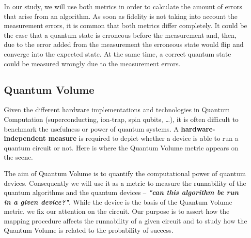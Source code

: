 In our study, we will use both metrics in order to calculate the amount of errors that arise from an algorithm.
As soon as fidelity is not taking into account the measurement errors, it is common that both metrics differ completely.
It could be the case that a quantum state is erroneous before the measurement and, then, due to the error added from the measurement the erroneous state would flip and converge into the expected state.
At the same time, a correct quantum state could be measured wrongly due to the measurement errors.

\subsection*{Quantum Volume}
\label{sec:orgf816293}

Given the different hardware implementations and technologies in Quantum Computation (superconducting, ion-trap, spin qubits, \ldots{}), it is often difficult to benchmark the usefulness or power of quantum systems. 
A \textbf{hardware-independent measure} is required to depict whether a device is able to run a quantum circuit or not.
Here is where the Quantum Volume metric appears on the scene.

The aim of Quantum Volume is to quantify the computational power of quantum devices. 
Consequently we will use it as a metric to measure the runnability of the quantum algorithms and the quantum devices -- \emph{\textbf{"can this algorithm be run in a given device?"}}.
While the device is the basis of the Quantum Volume metric, we fix our attention on the circuit.
Our purpose is to assert how the mapping procedure affects the runnability of a given circuit and to study how the Quantum Volume is related to the probability of success.

